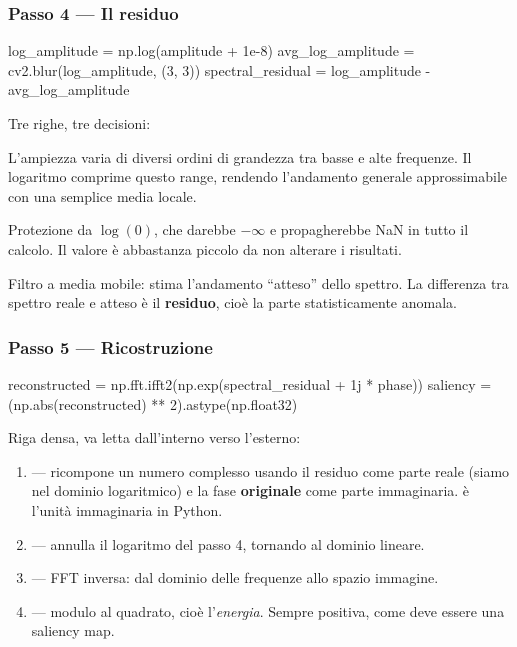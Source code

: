 \subsubsection{Passo 4 --- Il residuo}

\begin{idebox}
\begin{pycode}
log_amplitude = np.log(amplitude + 1e-8)
avg_log_amplitude = cv2.blur(log_amplitude, (3, 3))
spectral_residual = log_amplitude - avg_log_amplitude
\end{pycode}
\end{idebox}

Tre righe, tre decisioni:

\begin{description}[leftmargin=1.2em,style=nextline]
\item[\pyin{np.log(...)}] L'ampiezza varia di diversi ordini di grandezza tra basse e alte
frequenze. Il logaritmo comprime questo range, rendendo l'andamento generale approssimabile con
una semplice media locale.

\item[\pyin{+ 1e-8}] Protezione da $\log(0)$, che darebbe $-\infty$ e propagherebbe NaN in tutto
il calcolo. Il valore è abbastanza piccolo da non alterare i risultati.

\item[\pyin{cv2.blur(..., (3,3))}] Filtro a media mobile: stima l'andamento ``atteso'' dello
spettro. La differenza tra spettro reale e atteso è il \textbf{residuo}, cioè la parte
statisticamente anomala.
\end{description}

\subsubsection{Passo 5 --- Ricostruzione}

\begin{idebox}
\begin{pycode}
reconstructed = np.fft.ifft2(np.exp(spectral_residual + 1j * phase))
saliency = (np.abs(reconstructed) ** 2).astype(np.float32)
\end{pycode}
\end{idebox}

Riga densa, va letta dall'interno verso l'esterno:

\begin{enumerate}
  \item {} --- ricompone un numero complesso usando il residuo
  come parte reale (siamo nel dominio logaritmico) e la fase \textbf{originale} come parte
  immaginaria.  è l'unità immaginaria in Python.
  \item {} --- annulla il logaritmo del passo 4, tornando al dominio lineare.
  \item {} --- FFT inversa: dal dominio delle frequenze allo spazio
  immagine.
  \item {} --- modulo al quadrato, cioè l'\emph{energia}. Sempre positiva,
  come deve essere una saliency map.
\end{enumerate}

